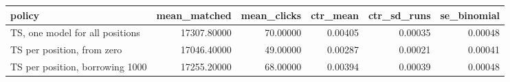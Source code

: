 \begin{tabular}{lrrrrr}
\toprule
policy & mean\_matched & mean\_clicks & ctr\_mean & ctr\_sd\_runs & se\_binomial \\
\midrule
TS, one model for all positions & 17307.80000 & 70.00000 & 0.00405 & 0.00035 & 0.00048 \\
TS per position, from zero & 17046.40000 & 49.00000 & 0.00287 & 0.00021 & 0.00041 \\
TS per position, borrowing 1000 & 17255.20000 & 68.00000 & 0.00394 & 0.00039 & 0.00048 \\
\bottomrule
\end{tabular}
